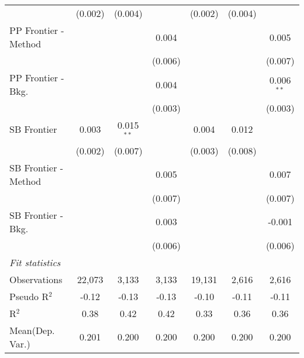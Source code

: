 \begin{tabular}{lcccccc}
                        & (0.002)       & (0.004)      &         & (0.002)       & (0.004)      &   \\   
   PP Frontier - Method &               &              & 0.004   &               &              & 0.005\\   
                        &               &              & (0.006) &               &              & (0.007)\\   
   PP Frontier - Bkg.   &               &              & 0.004   &               &              & 0.006$^{**}$\\   
                        &               &              & (0.003) &               &              & (0.003)\\   
   SB Frontier          & 0.003         & 0.015$^{**}$ &         & 0.004         & 0.012        &   \\   
                        & (0.002)       & (0.007)      &         & (0.003)       & (0.008)      &   \\   
   SB Frontier - Method &               &              & 0.005   &               &              & 0.007\\   
                        &               &              & (0.007) &               &              & (0.007)\\   
   SB Frontier - Bkg.   &               &              & 0.003   &               &              & -0.001\\   
                        &               &              & (0.006) &               &              & (0.006)\\   
   \midrule
   \emph{Fit statistics}\\
   Observations         & 22,073        & 3,133        & 3,133   & 19,131        & 2,616        & 2,616\\  
   Pseudo R$^2$         & -0.12         & -0.13        & -0.13   & -0.10         & -0.11        & -0.11\\  
   R$^2$                & 0.38          & 0.42         & 0.42    & 0.33          & 0.36         & 0.36\\  
Mean(Dep. Var.) & 0.201 & 0.200 & 0.200 & 0.200 & 0.200 & 0.200 \\
   

\end{tabular}
